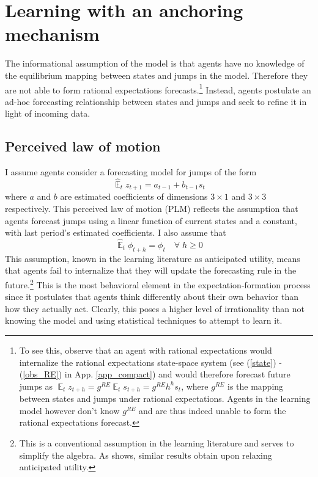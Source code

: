 \documentclass[11pt]{article}
\renewcommand{\[}{\begin{equation}}
\renewcommand{\]}{\end{equation}}
\DeclareMathOperator{\E}{\mathbb{E}}
\begin{document}
\section{Learning with an anchoring mechanism}\label{learning}
The informational assumption of the model is that agents have no knowledge of the equilibrium mapping between states and jumps in the model. Therefore they are not able to form rational expectations forecasts.\footnote{To see this, observe that an agent with rational expectations would internalize the rational expectations state-space system (see (\ref{state}) - (\ref{obs_RE}) in App. \ref{app_compact}) and would therefore forecast future jumps as $\E_t z_{t+h} = g^{RE}\E_ts_{t+h} = g^{RE}h^{h}s_t$, where $g^{RE}$ is the mapping between states and jumps under rational expectations. Agents in the learning model however don't know $g^{RE}$ and are thus indeed unable to form the rational expectations forecast.} Instead, agents postulate an ad-hoc forecasting relationship between states and jumps and seek to refine it in light of incoming data. 
\subsection{Perceived law of motion}
I assume agents consider a forecasting model for jumps of the form
\begin{equation}
\hat{\E}_{t}z_{t+1} = a_{t-1} + b_{t-1} s_{t} \label{PLM}  
\end{equation}
where $a$ and $b$ are estimated coefficients of dimensions $3\times1$ and $3\times3$ respectively. This perceived law of motion (PLM) reflects the assumption that agents forecast jumps using a linear function of current states and a constant, with last period's estimated coefficients. I also assume that 
\begin{equation}
\hat{\E}_{t}{\phi_{t+h}} = \phi_{t} \quad \forall \; h\geq0 
\end{equation}
This assumption, known in the learning literature as anticipated utility, means that agents fail to internalize that they will update the forecasting rule in the future.\footnote{This is a conventional assumption in the learning literature and serves to simplify the algebra. As \cite{sargent1999} shows, similar results obtain upon relaxing anticipated utility.} This is the most behavioral element in the expectation-formation process since it postulates that agents think differently about their own behavior than how they actually act. Clearly, this poses a higher level of irrationality than not knowing the model and using statistical techniques to attempt to learn it.
\end{document}
